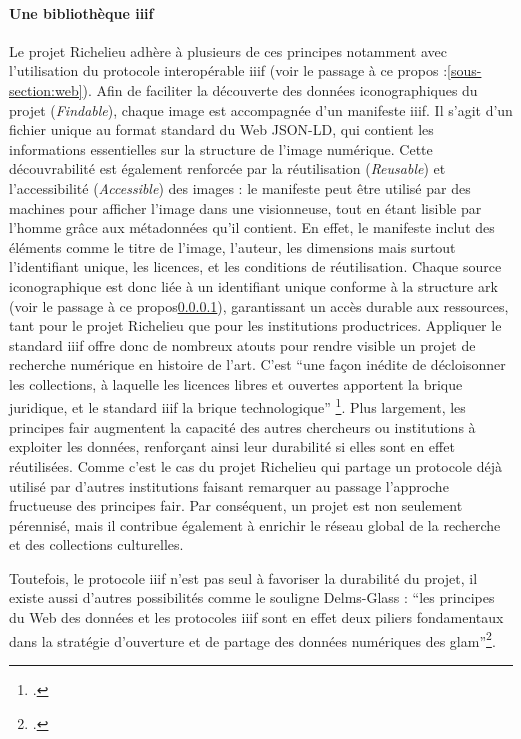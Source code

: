 \paragraph{Une bibliothèque \acrshort{iiif}}
Le projet Richelieu adhère à plusieurs de ces principes notamment avec l'utilisation du protocole interopérable \acrshort{iiif} (voir le passage à ce propos :\ref{sous-section:web}). Afin de faciliter la découverte des données iconographiques du projet (\textit{Findable}), chaque image est accompagnée d'un manifeste \acrshort{iiif}. Il s'agit d'un fichier unique au format standard du Web JSON-LD, qui contient les informations essentielles sur la structure de l'image numérique. Cette découvrabilité est également renforcée par  la réutilisation (\textit{Reusable}) et l'accessibilité (\textit{Accessible}) des images : le manifeste peut être utilisé par des machines pour afficher l'image dans une visionneuse, tout en étant lisible par l'homme grâce aux métadonnées qu'il contient. En effet, le manifeste inclut des éléments comme le titre de l'image, l'auteur, les dimensions mais surtout l'identifiant unique, les licences, et les conditions de réutilisation. Chaque source iconographique est donc liée à un identifiant unique conforme à la structure \acrshort{ark} (voir le passage à ce propos\ref{}), garantissant un accès durable aux ressources, tant pour le projet Richelieu que pour les institutions productrices. 
Appliquer le standard \acrshort{iiif} offre donc de nombreux atouts pour rendre visible un projet de recherche numérique en histoire de l'art. C'est \enquote{une façon inédite de décloisonner les collections, à laquelle les licences libres et ouvertes apportent la brique juridique, et le standard \acrshort{iiif} la brique technologique} \footcite{DELMAS-GLASSHumanites2021}. Plus largement, les principes  \acrshort{fair} augmentent la capacité des autres chercheurs ou institutions à exploiter les données, renforçant ainsi leur durabilité si elles sont en effet réutilisées. Comme c'est le cas du projet Richelieu qui partage un protocole déjà utilisé par d'autres institutions faisant remarquer au passage l'approche fructueuse des principes \acrshort{fair}. Par conséquent, un projet est non seulement pérennisé, mais il contribue également à enrichir le réseau global de la recherche et des collections culturelles. 

Toutefois, le protocole \acrshort{iiif} n'est pas seul à favoriser la durabilité du projet, il existe aussi d'autres possibilités comme le souligne Delms-Glass : \enquote{les principes du Web des données et les protocoles \acrshort{iiif} sont en effet deux piliers fondamentaux dans la stratégie d’ouverture et de partage des données numériques des \acrshort{glam}}\footcite{DELMAS-GLASSHumanites2021}. 


